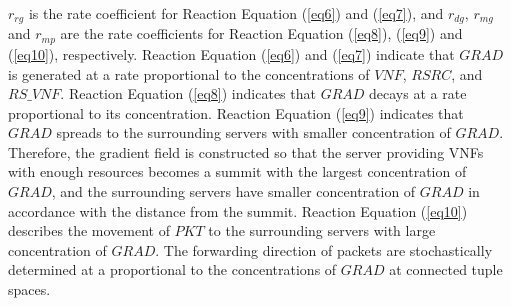 \documentclass[technicalreport]{ieicej}
\begin{document}
	$\mathit{r_{rg}}$ is the rate coefficient for Reaction Equation (\ref{eq6}) and (\ref{eq7}), and $\mathit{r_{dg}}$, $\mathit{r_{mg}}$ and $\mathit{r_{mp}}$ are the rate coefficients for Reaction Equation (\ref{eq8}), (\ref{eq9}) and (\ref{eq10}), respectively.
	Reaction Equation (\ref{eq6}) and (\ref{eq7}) indicate that $\mathit{GRAD}$ is generated at a rate proportional to the concentrations of $\mathit{VNF}$, $\mathit{RSRC}$, and $\mathit{RS\_VNF}$.
	Reaction Equation (\ref{eq8}) indicates that $\mathit{GRAD}$ decays at a rate proportional to its concentration.
	Reaction Equation (\ref{eq9}) indicates that $\mathit{GRAD}$ spreads to the surrounding servers with smaller concentration of $\mathit{GRAD}$.
	Therefore, the gradient field is constructed so that the server providing VNFs with enough resources becomes a summit with the largest concentration of $\mathit{GRAD}$, and the surrounding servers have smaller concentration of $\mathit{GRAD}$ in accordance with the distance from the summit.
	Reaction Equation (\ref{eq10}) describes the movement of $\mathit{PKT}$ to the surrounding servers with large concentration of $\mathit{GRAD}$.
	The forwarding direction of packets are stochastically determined at a proportional to the concentrations of $\mathit{GRAD}$ at connected tuple spaces.
\end{document}
